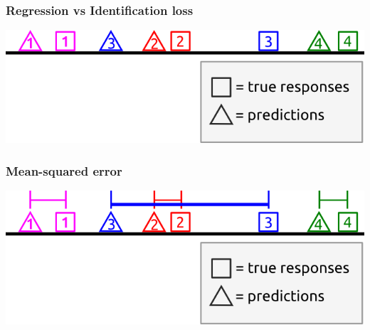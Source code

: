 \documentclass{beamer}
\begin{document}

\begin{frame}
\frametitle{Regression vs Identification loss}
\begin{center}
\includegraphics[scale = 0.5]{../diagram/idloss1.png}
\end{center}
\end{frame}

\begin{frame}
\frametitle{Mean-squared error}
\begin{center}
\includegraphics[scale = 0.5]{../diagram/idloss2a.png}
\end{center}
\end{frame}
\end{document}
